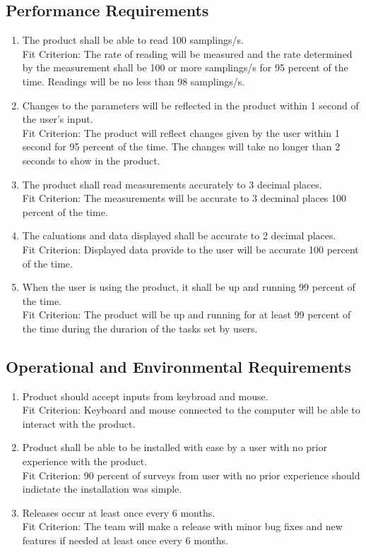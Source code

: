 \documentclass[12pt, titlepage]{article}
\begin{document}
\subsection{Performance Requirements}
\begin{adjustwidth}{2.2em}{0pt}
\begin{enumerate}[{NFR-P}1.]
  \item The product shall be able to read 100 samplings/s.\\
  Fit Criterion: The rate of reading will be measured and the rate determined by the measurement shall be 100 or more samplings/s for 95 percent of the time. 
  Readings will be no less than 98 samplings/s.
  \item Changes to the parameters will be reflected in the product within 1 second of the user's input.\\
  Fit Criterion: The product will reflect changes given by the user within 1 second for 95 percent of the time. 
  The changes will take no longer than 2 seconds to show in the product.
  \item The product shall read measurements accurately to 3 decimal places.\\
  Fit Criterion: The measurements will be accurate to 3 decminal places 100 percent of the time.
  \item The caluations and data displayed shall be accurate to 2 decimal places.\\
  Fit Criterion: Displayed data provide to the user will be accurate 100 percent of the time.
  \item When the user is using the product, it shall be up and running 99 percent of the time.\\
  Fit Criterion: The product will be up and running for at least 99 percent of the time during the durarion of the tasks set by users.
\end{enumerate}
\end{adjustwidth}

\subsection{Operational and Environmental Requirements}
\begin{adjustwidth}{2.2em}{0pt}
\begin{enumerate}[{NFR-O}1.]
  \item Product should accept inputs from keybroad and mouse.\\
  Fit Criterion: Keyboard and mouse connected to the computer will be able to interact with the product.
  \item Product shall be able to be installed with ease by a user with no prior experience with the product.\\
  Fit Criterion: 90 percent of surveys from user with no prior experience should indictate the installation was simple.
  \item Releases occur at least once every 6 months.\\
  Fit Criterion: The team will make a release with minor bug fixes and new features if needed at least once every 6 months.
\end{enumerate}
\end{adjustwidth}
\end{document}

